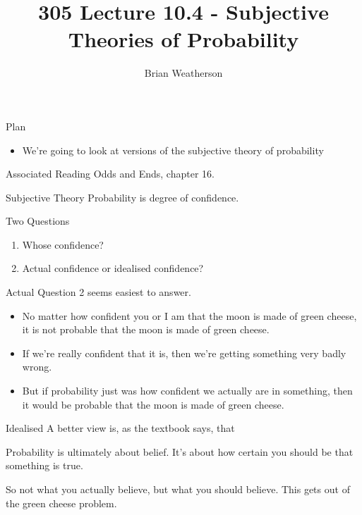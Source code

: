 \documentclass[
  ignorenonframetext,
]{beamer}
\title{305 Lecture 10.4 - Subjective Theories of Probability}
\author{Brian Weatherson}
\date{}
\providecommand{\tightlist}{%
  \setlength{\itemsep}{0pt}\setlength{\parskip}{0pt}}
\renewcommand{\,}{\text{, }}
\renewenvironment*{quote}	
	{\list{}{\rightmargin   \leftmargin} \item } 	
	{\endlist }
\begin{document}
\frame{\titlepage}

\begin{frame}{Plan}
\protect\hypertarget{plan}{}
\begin{itemize}
\tightlist
\item
  We're going to look at versions of the subjective theory of
  probability
\end{itemize}
\end{frame}

\begin{frame}{Associated Reading}
\protect\hypertarget{associated-reading}{}
Odds and Ends, chapter 16.
\end{frame}

\begin{frame}{Subjective Theory}
\protect\hypertarget{subjective-theory}{}
Probability is degree of confidence.
\end{frame}

\begin{frame}{Two Questions}
\protect\hypertarget{two-questions}{}
\begin{enumerate}
\tightlist
\item
  Whose confidence? \pause
\item
  Actual confidence or idealised confidence?
\end{enumerate}
\end{frame}

\begin{frame}{Actual}
\protect\hypertarget{actual}{}
Question 2 seems easiest to answer.

\begin{itemize}
\tightlist
\item
  No matter how confident you or I am that the moon is made of green
  cheese, it is not probable that the moon is made of green cheese.
\item
  If we're really confident that it is, then we're getting something
  very badly wrong.
\item
  But if probability just was how confident we actually are in
  something, then it would be probable that the moon is made of green
  cheese.
\end{itemize}
\end{frame}

\begin{frame}{Idealised}
\protect\hypertarget{idealised}{}
A better view is, as the textbook says, that

\begin{quote}
Probability is ultimately about belief. It's about how certain you
should be that something is true.
\end{quote}

So not what you actually believe, but what you should believe. This gets
out of the green cheese problem.
\end{frame}
\end{document}
